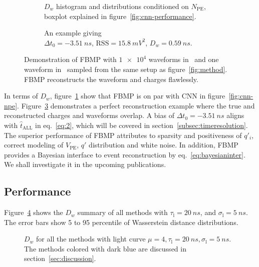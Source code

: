 \begin{figure}[H]
  \begin{subfigure}[b]{.45\textwidth}
    \centering
    \resizebox{1.05\textwidth}{!}{}
    \caption{\label{fig:fbmp-npe} $D_w$ histogram and distributions conditioned on $N_{\mathrm{PE}}$, boxplot explained in figure~\ref{fig:cnn-performance}.}
  \end{subfigure}
  \hspace{0.5em}
  \begin{subfigure}[b]{.55\textwidth}
    \centering
    \resizebox{\textwidth}{!}{}
    \caption{\label{fig:fbmp} An example giving \\ $\Delta{t_0}=\SI{-3.51}{ns}$, $\mathrm{RSS}=\SI{15.8}{mV^2}$, $D_w=\SI{0.59}{ns}$.}
  \end{subfigure}
  \caption{Demonstration of FBMP with $\num[retain-unity-mantissa=false]{1e4}$ waveforms in~ and one waveform in~ sampled from the same setup as figure~\ref{fig:method}.  FBMP reconstructs the waveform and charges flawlessly.}
\end{figure}
In terms of $D_w$, figure~\ref{fig:fbmp-npe} show that FBMP is on par with CNN in figure~\ref{fig:cnn-npe}.  Figure~\ref{fig:fbmp} demonstrates a perfect reconstruction example where the true and reconstructed charges and waveforms overlap.  A bias of $\Delta{t_0}=\SI{-3.51}{ns}$ aligns with $\hat{t}_\mathrm{ALL}$ in eq.~\eqref{eq:2}, which will be covered in section~\ref{subsec:timeresolution}.  The superior performance of FBMP attributes to sparsity and positiveness of $q'_i$, correct modeling of $V_\mathrm{PE}$, $q'$ distribution and white noise.  In addition, FBMP provides a Bayesian interface to event reconstruction by eq.~\eqref{eq:bayesianinter}.  We shall investigate it in the upcoming publications.
\subsection{Performance}


Figure~\ref{fig:chargesummary} shows the $D_w$ summary of all methods with $\tau_\mathrm{l}=\SI{20}{ns}$, and $\sigma_\mathrm{l}=\SI{5}{ns}$. The error bars show 5 to 95 percentile of Wasserstein distance distributions. 

\begin{figure}[H]
    \centering
    \resizebox{\textwidth}{!}{}
    \caption{\label{fig:chargesummary} $D_w$ for all the methods with light curve $\mu=4, \tau_\mathrm{l}=\SI{20}{ns}, \sigma_\mathrm{l}=\SI{5}{ns}$. The methods colored with dark blue are discussed in section~\ref{sec:discussion}. }
\end{figure}

